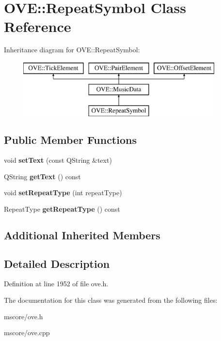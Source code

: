 \hypertarget{class_o_v_e_1_1_repeat_symbol}{}\section{O\+VE\+:\+:Repeat\+Symbol Class Reference}
\label{class_o_v_e_1_1_repeat_symbol}
Inheritance diagram for O\+VE\+:\+:Repeat\+Symbol\+:\begin{figure}[H]
\begin{center}
\leavevmode
\includegraphics[height=3.000000cm]{class_o_v_e_1_1_repeat_symbol}
\end{center}
\end{figure}
\subsection*{Public Member Functions}
\begin{DoxyCompactItemize}
\item 
\mbox{\label{class_o_v_e_1_1_repeat_symbol_ab471633864e9b45858d7c5ab4c785471}} 
void {\bfseries set\+Text} (const Q\+String \&text)
\item 
\mbox{\label{class_o_v_e_1_1_repeat_symbol_ab696e6fad00480df0e54e75313b5464a}} 
Q\+String {\bfseries get\+Text} () const
\item 
\mbox{\label{class_o_v_e_1_1_repeat_symbol_a44e4a4dd956542b064111acb22dd1c14}} 
void {\bfseries set\+Repeat\+Type} (int repeat\+Type)
\item 
\mbox{\label{class_o_v_e_1_1_repeat_symbol_adb29c4621f81041e4869ceb828fb34cf}} 
Repeat\+Type {\bfseries get\+Repeat\+Type} () const
\end{DoxyCompactItemize}
\subsection*{Additional Inherited Members}


\subsection{Detailed Description}


Definition at line 1952 of file ove.\+h.



The documentation for this class was generated from the following files\+:\begin{DoxyCompactItemize}
\item 
mscore/ove.\+h\item 
mscore/ove.\+cpp\end{DoxyCompactItemize}
